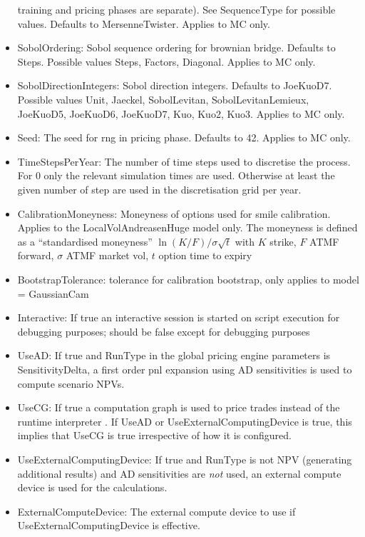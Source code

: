 \begin{itemize}
  training and pricing phases are separate). See SequenceType for possible values. Defaults to MersenneTwister. Applies
  to MC only.
\item SobolOrdering: Sobol sequence ordering for brownian bridge. Defaults to Steps. Possible values Steps, Factors,
  Diagonal. Applies to MC only.
\item SobolDirectionIntegers: Sobol direction integers. Defaults to JoeKuoD7. Possible values Unit, Jaeckel,
  SobolLevitan, SobolLevitanLemieux, JoeKuoD5, JoeKuoD6, JoeKuoD7, Kuo, Kuo2, Kuo3. Applies to MC only.
\item Seed: The seed for rng in pricing phase. Defaults to 42. Applies to MC only.
\item TimeStepsPerYear: The number of time steps used to discretise the process. For 0 only the relevant simulation
  times are used. Otherwise at least the given number of step are used in the discretisation grid per year.
\item CalibrationMoneyness: Moneyness of options used for smile calibration. Applies to the LocalVolAndreasenHuge model
  only. The moneyness is defined as a ``standardised moneyness'' $\ln(K/F) / \sigma\sqrt{t}$ with $K$ strike, $F$ ATMF
  forward, $\sigma$ ATMF market vol, $t$ option time to expiry
\item BootstrapTolerance: tolerance for calibration bootstrap, only applies to model = GaussianCam
\item Interactive: If true an interactive session is started on script execution for debugging purposes; should be false
  except for debugging purposes
\item UseAD: If true and RunType in the global pricing engine parameters is SensitivityDelta, a first order pnl
  expansion using AD sensitivities is used to compute scenario NPVs.
\item UseCG: If true a computation graph is used to price trades instead of the runtime interpreter . If UseAD or
  UseExternalComputingDevice is true, this implies that UseCG is true irrespective of how it is configured.
\item UseExternalComputingDevice: If true and RunType is not NPV (generating additional results) and AD sensitivities
  are {\em not} used, an external compute device is used for the calculations.
\item ExternalComputeDevice: The external compute device to use if UseExternalComputingDevice is effective.
\end{itemize}

